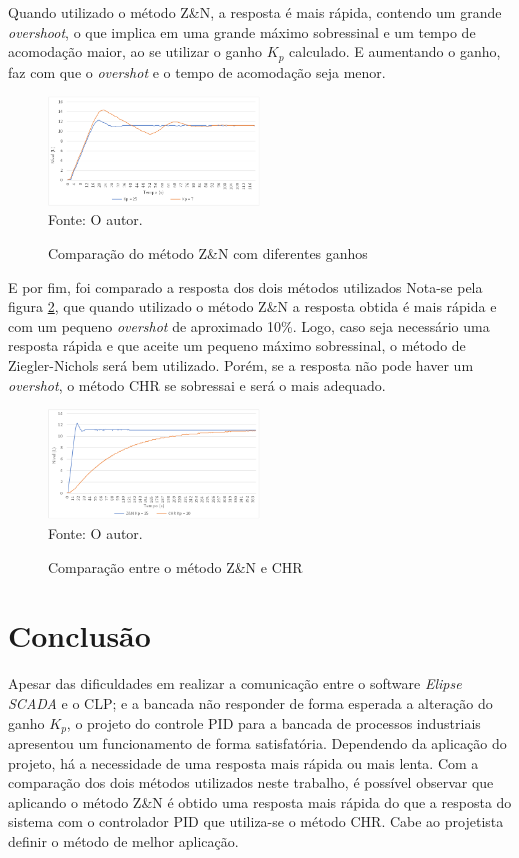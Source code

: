 \documentclass[12 pt,conference]{IEEEtran}
\begin{document}
    Quando utilizado o método Z\&N, a resposta é mais rápida, contendo um grande \textit{overshoot}, o que implica em uma grande máximo sobressinal e um tempo de acomodação maior, ao se utilizar o ganho \(K_p\) calculado. E aumentando o ganho, faz com que o \textit{overshot} e o tempo de acomodação seja menor.
    
    \begin{figure}[!http]
       \centering
        \caption{Comparação do método Z\&N com diferentes ganhos}
        \includegraphics[width=0.5\textwidth]{imagens/grafico_Z&N.png}\\ 
        Fonte: O autor.
        \label{ZN}
    \end{figure}
    
    E por fim, foi comparado a resposta dos dois métodos utilizados Nota-se pela figura \ref{ZNCHR}, que quando utilizado o método Z\&N a resposta obtida é mais rápida e com um pequeno \textit{overshot} de aproximado 10\%. Logo, caso seja necessário uma resposta rápida e que aceite um pequeno máximo sobressinal, o método de Ziegler-Nichols será bem utilizado. Porém, se a resposta não pode haver um \textit{overshot}, o método CHR se sobressai e será o mais adequado. 
    
    \begin{figure}[!http]
       \centering
        \caption{Comparação entre o método Z\&N e CHR}
        \includegraphics[width=0.5\textwidth]{imagens/grafico_Z&N_CHR.png}\\ 
        Fonte: O autor.
        \label{ZNCHR}
    \end{figure}

    \section{Conclusão}
    Apesar das dificuldades em realizar a comunicação entre o software \textit{Elipse SCADA} e o CLP; e a bancada não responder de forma esperada a alteração do ganho $K_p$, o projeto do controle PID para a bancada de processos industriais apresentou um funcionamento de forma satisfatória. Dependendo da aplicação do projeto, há a necessidade de uma resposta mais rápida ou mais lenta. Com a comparação dos dois métodos utilizados neste trabalho, é possível observar que aplicando o método Z\&N é obtido uma resposta mais rápida do que a resposta do sistema com o controlador PID que utiliza-se o método CHR. Cabe ao projetista definir o método de melhor aplicação.
    
\end{document}
